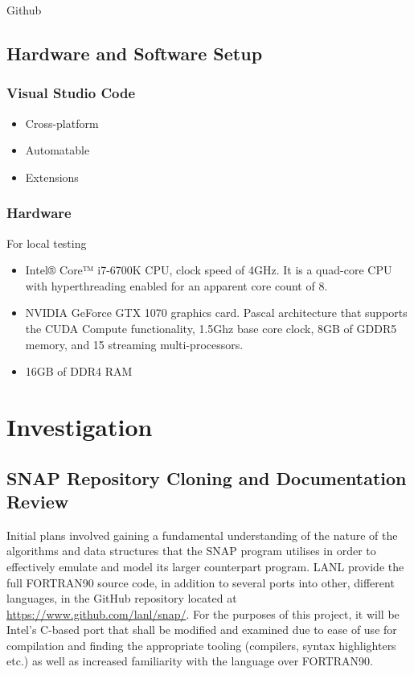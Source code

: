 \documentclass[conference]{IEEEtran}
\begin{document}
Github



\subsection{Hardware and Software Setup}

\subsubsection{Visual Studio Code}
\begin{itemize}
    \item Cross-platform
    \item Automatable
    \item Extensions
\end{itemize}

\subsubsection{Hardware}

For local testing

\begin{itemize}
    \item Intel® Core™ i7-6700K CPU, clock speed of 4GHz. It is a quad-core CPU with hyperthreading enabled for an apparent core count of 8.
    \item NVIDIA GeForce GTX 1070 graphics card. Pascal architecture that supports the CUDA Compute functionality, 1.5Ghz base core clock, 8GB of GDDR5 memory, and 15 streaming multi-processors.
    \item 16GB of DDR4 RAM
    \end{itemize}



\section{Investigation}\label{investigation}

\subsection{SNAP Repository Cloning and Documentation Review}

Initial plans involved gaining a fundamental understanding of the nature of the algorithms and data structures that the SNAP program utilises in order to effectively emulate and model its larger counterpart program. LANL provide the full FORTRAN90 source code, in addition to several ports into other, different languages, in the GitHub repository located at \url{https://www.github.com/lanl/snap/}. For the purposes of this project, it will be Intel's C-based port that shall be modified and examined due to ease of use for compilation and finding the appropriate tooling (compilers, syntax highlighters etc.) as well as increased familiarity with the language over FORTRAN90.
\end{document}
